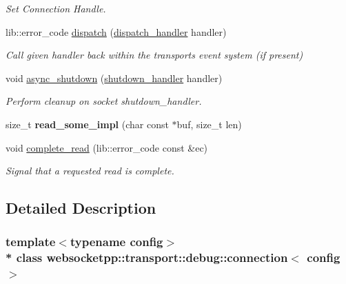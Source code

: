 \begin{DoxyCompactItemize}
\begin{DoxyCompactList}\small\item\em Set Connection Handle. \end{DoxyCompactList}\item 
lib\+::error\+\_\+code \hyperlink{classwebsocketpp_1_1transport_1_1debug_1_1connection_a4cac08eb7b8646fc042d465b3bb645a6}{dispatch} (\hyperlink{namespacewebsocketpp_1_1transport_a6658447b2e10f4c712dd792aad0e0c78}{dispatch\+\_\+handler} handler)
\begin{DoxyCompactList}\small\item\em Call given handler back within the transport\textquotesingle{}s event system (if present) \end{DoxyCompactList}\item 
void \hyperlink{classwebsocketpp_1_1transport_1_1debug_1_1connection_aa1269aca10cf5de3cf031eac5f499075}{async\+\_\+shutdown} (\hyperlink{namespacewebsocketpp_1_1transport_af39aff6fc4cb76f7df0d5322b734d156}{shutdown\+\_\+handler} handler)
\begin{DoxyCompactList}\small\item\em Perform cleanup on socket shutdown\+\_\+handler. \end{DoxyCompactList}\item 
size\+\_\+t {\bfseries read\+\_\+some\+\_\+impl} (char const $\ast$buf, size\+\_\+t len)\hypertarget{classwebsocketpp_1_1transport_1_1debug_1_1connection_a7e17152ea6389887e1a19da2ca53cf8b}{}\label{classwebsocketpp_1_1transport_1_1debug_1_1connection_a7e17152ea6389887e1a19da2ca53cf8b}

\item 
void \hyperlink{classwebsocketpp_1_1transport_1_1debug_1_1connection_a1eb6d0259dfd111b99edc1edae4014f5}{complete\+\_\+read} (lib\+::error\+\_\+code const \&ec)
\begin{DoxyCompactList}\small\item\em Signal that a requested read is complete. \end{DoxyCompactList}\end{DoxyCompactItemize}


\subsection{Detailed Description}
\subsubsection*{template$<$typename config$>$\\*
class websocketpp\+::transport\+::debug\+::connection$<$ config $>$}



